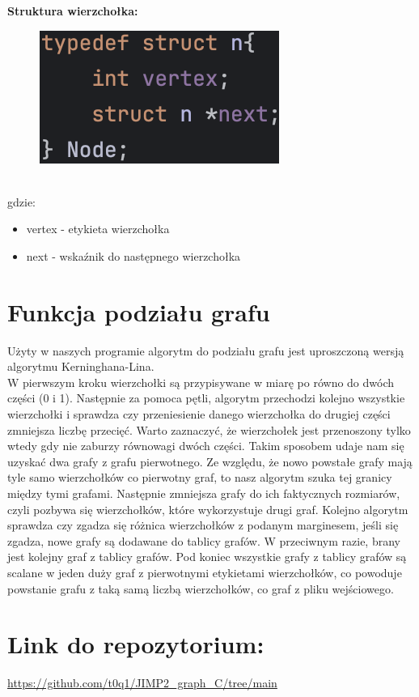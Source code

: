 \documentclass{article}
\begin{document}
\newpage
\textbf{Struktura wierzchołka:}\\
\begin{figure}[ht]
  \includegraphics[]{img/node.png}
\end{figure}\\
gdzie:
\begin{itemize}
    \item vertex - etykieta wierzchołka
    \item next - wskaźnik do następnego wierzchołka
\end{itemize}


\section*{Funkcja podziału grafu}
Użyty w naszych programie algorytm do podziału grafu jest uproszczoną wersją algorytmu Kerninghana-Lina. \\W pierwszym kroku wierzchołki są przypisywane w miarę po równo do dwóch części (0 i 1). Następnie za pomoca pętli, algorytm przechodzi kolejno wszystkie wierzchołki i sprawdza czy przeniesienie danego wierzchołka do drugiej części zmniejsza liczbę przecięć. Warto zaznaczyć, że wierzchołek jest przenoszony tylko wtedy gdy nie zaburzy równowagi dwóch części. Takim sposobem udaje nam się uzyskać dwa grafy z grafu pierwotnego. Ze względu, że nowo powstałe grafy mają tyle samo wierzchołków co pierwotny graf, to nasz algorytm szuka tej granicy między tymi grafami. Następnie zmniejsza grafy do ich faktycznych rozmiarów, czyli pozbywa się wierzchołków, które wykorzystuje drugi graf. Kolejno algorytm sprawdza czy zgadza się różnica wierzchołków z podanym marginesem, jeśli się zgadza, nowe grafy są dodawane do tablicy grafów. W przeciwnym razie, brany jest kolejny graf z tablicy grafów. Pod koniec wszystkie grafy z tablicy grafów są scalane w jeden duży graf z pierwotnymi etykietami wierzchołków, co powoduje powstanie grafu z taką samą liczbą wierzchołków, co graf z pliku wejściowego.

\section*{Link do repozytorium:}
\url{https://github.com/t0q1/JIMP2_graph_C/tree/main}
\end{document}
